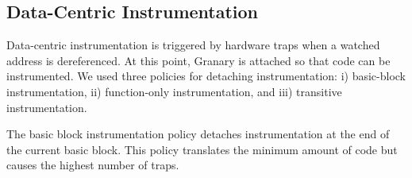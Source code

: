 







\subsection{Data-Centric Instrumentation}\label{sec:data-centric}
Data-centric instrumentation is triggered by hardware traps when a watched address is dereferenced. At this point, Granary is attached so that code can be instrumented. We used three policies for detaching instrumentation: i) basic-block instrumentation, ii) function-only instrumentation, and iii) transitive instrumentation. %

The basic block instrumentation policy detaches instrumentation at the end of the current basic block. This policy translates the minimum amount of code but causes the highest number of traps.

